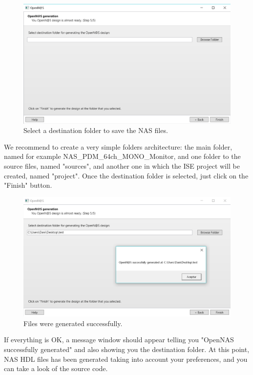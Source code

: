 \begin{figure}[H]
\centering
\includegraphics[width=1\textwidth]{images/Img24_S5_SaveFiles.PNG}
\caption{\label{fig:OpenNAS_s5_destination_folder}Select a destination folder to save the NAS files.}
\end{figure}

We recommend to create a very simple folders architecture: the main folder, named for example NAS\_PDM\_64ch\_MONO\_Monitor, and one folder to the source files, named "sources", and another one in which the ISE project will be created, named "project". Once the destination folder is selected, just click on the "Finish" button.

\begin{figure}[H]
\centering
\includegraphics[width=1\textwidth]{images/Img25_S5_SaveFiles_OK.PNG}
\caption{\label{fig:OpenNAS_s5_success}Files were generated successfully.}
\end{figure}

If everything is OK, a message window should appear telling you "OpenNAS successfully generated" and also showing you the destination folder. At this point, NAS HDL files has been generated taking into account your preferences, and you can take a look of the source code.

